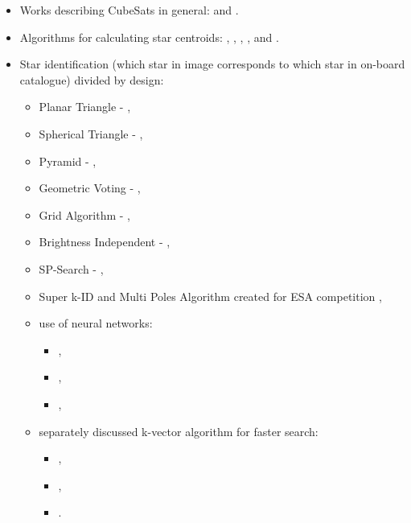 \documentclass[12pt,a4paper,oneside]{article}
\begin{document}
\begin{itemize}[noitemsep]
\item Works describing CubeSats in general: \citet{swartwout2011brief} and \citet{heidt2000cubesat}.

\item Algorithms for calculating star centroids: \citet{liebe2002accuracy}, \citet{samaan2002predictive}, \citet{knutson2012fast}, \citet{azizabadi2014vlsi}, \citet{lindh2014development} and \citet{zhang2014brightness}. 

\item Star identification (which star in image corresponds to which star in on-board catalogue) divided by design:
\begin{itemize}[noitemsep]
\item Planar Triangle - \citet{cole2006fast}, 
\item Spherical Triangle - \citet{cole2004fast}, 
\item Pyramid - \citet{mortari2004pyramid}, 
\item Geometric Voting - \citet{kolomenkin2008geometric}, 
\item Grid Algorithm - \citet{padgett1997grid}, 
\item Brightness Independent - \citet{dong2006brightness},
\item SP-Search - \citet{mortari1999sp},
\item Super k-ID and Multi Poles Algorithm created for ESA competition \cite{esa-competition},
\item use of neural networks: 
\begin{itemize}[noitemsep]
\item \citet{miri2012star}, 
\item \citet{lindbladstar},
\item \citet{li2003star}, 
\end{itemize}
\item separately discussed k-vector algorithm for faster search:
\begin{itemize}[noitemsep]
\item \citet{mortari1996fast}, 
\item \citet{mortari2000k},
\item \citet{mortari2013k}. 
\end{itemize}
\end{itemize}


\end{itemize}
\end{document}
